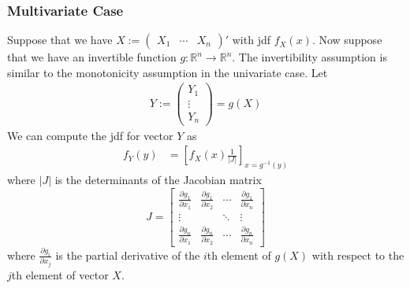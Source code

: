 \documentclass[12pt]{article}
\theoremstyle{plain}
\theoremstyle{definition}
\theoremstyle{remark}
\newcommand{\ra}{\rightarrow}
\newcommand{\Rn}{\mathbb{R}^n}
\begin{document}
\subsubsection{Multivariate Case}

Suppose that we have
$X:=\begin{pmatrix}X_1 & \cdots & X_n\end{pmatrix}'$ with jdf
$f_{X}(x)$.
Now suppose that we have an invertible function $g:\Rn\ra\Rn$. The
invertibility assumption is similar to the monotonicity assumption in
the univariate case.  Let
\begin{align*}
  Y:= \begin{pmatrix} Y_1 \\ \vdots \\ Y_n \end{pmatrix}
  = g(X)
\end{align*}
We can compute the jdf for vector $Y$ as
\begin{align*}
  f_{Y}(y)
   &= \left[
      f_{X}(x)\frac{1}{\lvert J\rvert}
      \right]_{x=g^{-1}(y)}
\end{align*}
where $|J|$ is the determinants of the Jacobian matrix
\begin{equation}
   J = \begin{bmatrix} \frac{\partial g_1}{\partial x_1} &
      \frac{\partial g_1}{\partial x_2} & \cdots &
      \frac{\partial g_1}{\partial x_n} \\
      \vdots & & \ddots & \vdots \\
      \frac{\partial g_n}{\partial x_1} &
      \frac{\partial g_n}{\partial x_2} & \cdots &
      \frac{\partial g_n}{\partial x_n}
   \end{bmatrix}
\end{equation}
where $\frac{\partial g_i}{\partial x_j}$ is the partial derivative of
the $i$th element of $g(X)$ with respect to the $j$th element of vector
$X$.
\end{document}
